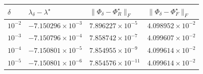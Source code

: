 \begin{center}
\begin{tabular}{@{}llll@{}}
\toprule
\(\delta\) & \(\lambda_\delta-\lambda^\star\) & \(\|\Phi_\delta-\Phi_R^\star\|_F\) & \(\|\Phi_\delta-\Phi_F^\star\|_F\)\\
\midrule
\(10^{-2}\) & \(-7.150296\times10^{-3}\) & \(7.896227\times10^{-5}\) & \(4.098952\times10^{-2}\)\\
\(10^{-3}\) & \(-7.150796\times10^{-4}\) & \(7.858742\times10^{-7}\) & \(4.099607\times10^{-2}\)\\
\(10^{-4}\) & \(-7.150801\times10^{-5}\) & \(7.854955\times10^{-9}\) & \(4.099614\times10^{-2}\)\\
\(10^{-5}\) & \(-7.150801\times10^{-6}\) & \(7.854576\times10^{-11}\) & \(4.099614\times10^{-2}\)\\
\bottomrule
\end{tabular}
\end{center}
